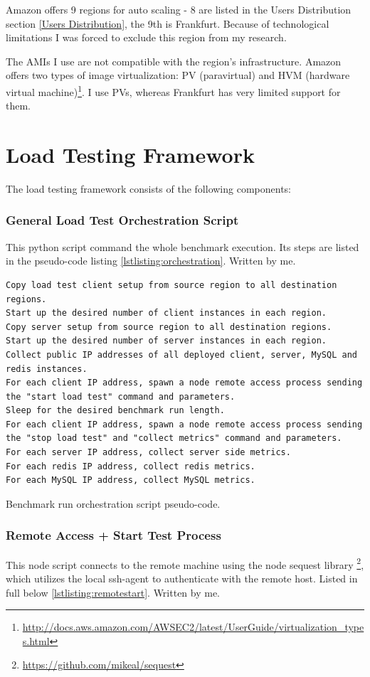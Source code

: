 \documentclass{uvamscse}
\begin{document}
Amazon offers 9 regions for auto scaling - 8 are listed in the Users Distribution section \ref{Users Distribution}, the 9th is Frankfurt. Because of technological limitations I was forced to exclude this region from my research.

The AMIs I use are not compatible with the region's infrastructure. Amazon offers two types of image virtualization: PV (paravirtual) and HVM (hardware virtual machine)\footnote{\url{http://docs.aws.amazon.com/AWSEC2/latest/UserGuide/virtualization_types.html}}. I use PVs, whereas Frankfurt has very limited support for them.

\section{Load Testing Framework}\label{Load Testing Framework}
The load testing framework consists of the following components:

\subsubsection{General Load Test Orchestration Script}
This python script command the whole benchmark execution. Its steps are listed in the pseudo-code listing \ref{lstlisting:orchestration}. Written by me.

\begin{sourcecode}[H]
\begin{lstlisting}[style=mono]
Copy load test client setup from source region to all destination regions.
Start up the desired number of client instances in each region.
Copy server setup from source region to all destination regions.
Start up the desired number of server instances in each region.
Collect public IP addresses of all deployed client, server, MySQL and redis instances.
For each client IP address, spawn a node remote access process sending
the "start load test" command and parameters.
Sleep for the desired benchmark run length.
For each client IP address, spawn a node remote access process sending
the "stop load test" and "collect metrics" command and parameters.
For each server IP address, collect server side metrics.
For each redis IP address, collect redis metrics.
For each MySQL IP address, collect MySQL metrics.
\end{lstlisting}
\caption{Benchmark run orchestration script pseudo-code.}
\label{lstlisting:orchestration}
\end{sourcecode}

\subsubsection{Remote Access + Start Test Process} This node script connects to the remote machine using the node sequest library \footnote{\url{https://github.com/mikeal/sequest}}, which utilizes the local ssh-agent to authenticate with the remote host. Listed in full below \ref{lstlisting:remotestart}. Written by me.
\end{document}
